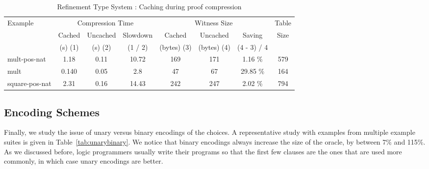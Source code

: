 \documentclass{llncs}
\begin{document}
\begin{table*}[htbp]
\begin{center}
\begin{small}
\begin{tabular}{|l|c|c|c|c|c|c|c|}
\hline
Example & \multicolumn{3}{c}{Compression Time} & 
\multicolumn{3}{c}{Witness Size} & Table\\
& Cached & Uncached & Slowdown & Cached & Uncached & Saving & Size\\
& (s) (1) & (s) (2) & (1 / 2) & (bytes) (3) & (bytes) (4) & (4 - 3) / 4& \\
\hline
mult-pos-nat & 1.18 & 0.11 & 10.72 & 169 & 171 & 1.16 \% & 579\\
mult & 0.140 & 0.05 & 2.8 & 47 & 67 & 29.85 \% & 164\\
square-pos-nat & 2.31 & 0.16 & 14.43 & 242 & 247 & 2.02 \% & 794\\
\hline
\end{tabular}
\end{small}
\end{center}
\caption{\label{tab:refcache} 
Refinement Type System : 
Caching during proof compression}
\end{table*}

\subsection{Encoding Schemes}
Finally, we study the issue of unary versus binary encodings of the choices.
A representative study with examples from multiple example suites is given
in Table~\ref{tab:unarybinary}. We notice that binary encodings always 
increase the size of the oracle, by between 7\% and 115\%. As we discussed
before, logic programmers usually write their programs so that the first
few clauses are the ones that are used more commonly, in which case unary 
encodings are better.
\end{document}

